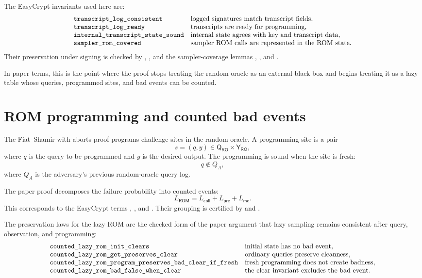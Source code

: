 The EasyCrypt invariants used here are:
\[
\begin{array}{ll}
\texttt{transcript\_log\_consistent} &
  \text{logged signatures match transcript fields},\\
\texttt{transcript\_log\_ready} &
  \text{transcripts are ready for programming},\\
\texttt{internal\_transcript\_state\_sound} &
  \text{internal state agrees with key and transcript data},\\
\texttt{sampler\_rom\_covered} &
  \text{sampler ROM calls are represented in the ROM state}.
\end{array}
\]
Their preservation under signing is checked by
,
, and the
sampler-coverage lemmas
,
, and
.

In paper terms, this is the point where the proof stops treating the random
oracle as an external black box and begins treating it as a lazy table whose
queries, programmed sites, and bad events can be counted.

\section{ROM programming and counted bad events}
\label{sec:paper-proof-rom-programming}

The Fiat--Shamir-with-aborts proof programs challenge sites in the random
oracle.  A programming site is a pair
\[
  s=(q,y)\in \mathsf{Q}_{\mathsf{RO}}\times\mathsf{Y}_{\mathsf{RO}},
\]
where \(q\) is the query to be programmed and \(y\) is the desired output.  The
programming is sound when the site is fresh:
\[
  q\notin Q_A,
\]
where \(Q_A\) is the adversary's previous random-oracle query log.

The paper proof decomposes the failure probability into counted events:
\[
  L_{\mathsf{ROM}}
  =
  L_{\mathsf{coll}}
  +
  L_{\mathsf{pre}}
  +
  L_{\mathsf{me}}.
\]
This corresponds to the EasyCrypt terms
,
, and
.  Their grouping is certified by
 and
.

The preservation laws for the lazy ROM are the checked form of the paper
argument that lazy sampling remains consistent after query, observation, and
programming:
\[
\begin{array}{ll}
\texttt{counted\_lazy\_rom\_init\_clears} &
  \text{initial state has no bad event},\\
\texttt{counted\_lazy\_rom\_get\_preserves\_clear} &
  \text{ordinary queries preserve cleanness},\\
\texttt{counted\_lazy\_rom\_program\_preserves\_bad\_clear\_if\_fresh} &
  \text{fresh programming does not create badness},\\
\texttt{counted\_lazy\_rom\_bad\_false\_when\_clear} &
  \text{the clear invariant excludes the bad event}.
\end{array}
\]

